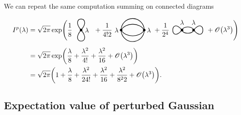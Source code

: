 \begin{example}
  We can repeat the same computation summing on connected diagrams
  \begin{align*}
    I^p(\lambda)
    &= \sqrt{2 \pi} \exp \Biggl( 
      \frac{1}{8} \hspace{-2mm}
      \begin{tikzpicture}[scale=2, baseline=-1mm]
        \draw[fill=black] (0, 0) circle (.3mm);
        \node at (.15, 0) {$\lambda$};
        \draw[thick] (0, 0) to[out=50, in=130, loop] (0, 0);
        \draw[thick] (0, 0) to[out=230, in=-50, loop] (0, 0);
      \end{tikzpicture}
    + \frac{1}{4! 2}
    \begin{tikzpicture}[scale=2, baseline=-1mm]
      \draw[fill=black] (0, 0) circle (.3mm);
      \node at (-.12, 0) {$\lambda$};
      \draw[fill=black] (.6, 0) circle (.3mm);
      \node at (.72, 0) {$\lambda$};
      \draw[thick] (.3, 0) circle (3mm);
      \draw[thick] (0, 0) to[out=60, in=120] (.6, 0);
      \draw[thick] (0, 0) to[out=-60, in=-120] (.6, 0);
    \end{tikzpicture}
    + \frac{1}{2^4} 
    \begin{tikzpicture}[scale=2, baseline=-1mm]
      \draw[fill=black] (0, 0) circle (.3mm);
      \draw[fill=black] (.3, 0) circle (.3mm);
      \node at (0, .2) {$\lambda$};
      \node at (.3, .2) {$\lambda$};
      \draw[thick] (0, 0) to[out=-130, in=130, loop] (0, 0);
      \draw[thick] (.3, 0) to[out=-50, in=50, loop] (.3, 0);
      \draw[thick] (0, 0) to[out=70, in=110] (.3, 0);
      \draw[thick] (0, 0) to[out=-70, in=-110] (.3, 0);
    \end{tikzpicture}
    + \Oscr \bigl(\lambda^3\bigr) \Biggr) \\
    &= \sqrt{2 \pi} \exp \biggl( \frac{\lambda}{8} + \frac{\lambda^2}{4!}
        + \frac{\lambda^2}{16} + \Oscr \bigl( \lambda^3 \bigr) \biggr) \\
    &= \sqrt{2 \pi} \biggl( 1 + \frac{\lambda}{8} + \frac{\lambda^2}{2 4!}
        + \frac{\lambda^2}{16} + \frac{\lambda^2}{ 8^2 2}
        + \Oscr \bigl( \lambda^3 \bigr) \biggr).
  \end{align*}
\end{example}

\subsection{Expectation value of perturbed Gaussian}

